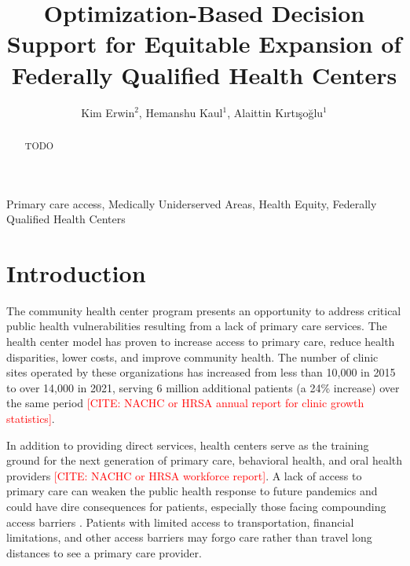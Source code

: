 \documentclass[11pt]{article}
\begin{document}
\title{Optimization-Based Decision Support for Equitable Expansion of Federally Qualified Health Centers}

\author{Kim Erwin$^2$, Hemanshu Kaul$^1$, Alaittin K\i rt\i \c{s}o\u{g}lu$^1$}

\date{}

\maketitle

\begin{abstract}
TODO
\end{abstract}
 Primary care access, Medically Uniderserved Areas, Health Equity, Federally Qualified Health Centers

\tableofcontents

\newpage



\section{Introduction}

The community health center program presents an opportunity to address critical public health 
vulnerabilities resulting from a lack of primary care services. The health center model has 
proven to increase access to primary care, reduce health disparities, lower costs, and improve 
community health. The number of clinic sites operated by these organizations has increased from 
less than 10,000 in 2015 to over 14,000 in 2021, serving 6 million additional patients (a 24\% increase) 
over the same period \textcolor{red}{[CITE: NACHC or HRSA annual report for clinic growth statistics]}.

In addition to providing direct services, health centers serve as the training ground for the next
generation of primary care, behavioral health, and oral health providers \textcolor{red}{[CITE: NACHC or HRSA workforce report]}. A lack of access to primary
care can weaken the public health response to future pandemics and could have dire consequences for
patients, especially those facing compounding access barriers \cite{NASEM2021}. Patients with limited access to
transportation, financial limitations, and other access barriers may forgo care rather than travel
long distances to see a primary care provider.
\end{document}

